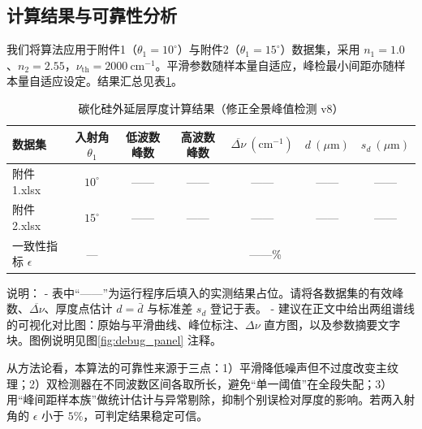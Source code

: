\documentclass{ctexart} %
\begin{document}
\subsection{计算结果与可靠性分析}
我们将算法应用于附件1（\(\theta_1=10^\circ\)）与附件2（\(\theta_1=15^\circ\)）数据集，采用 \(n_1=1.0\)、\(n_2=2.55\)，\(\nu_{\mathrm{th}}=2000~\mathrm{cm}^{-1}\)。平滑参数随样本量自适应，峰检最小间距亦随样本量自适应设定。结果汇总见表\ref{tab:res_sic}。

\begin{table}[h]
    \centering
    \caption{碳化硅外延层厚度计算结果（修正全景峰值检测 v8）}
    \label{tab:res_sic}
    \begin{tabular}{lcccccc}
        \toprule
        数据集              & 入射角 $\theta_1$ & 低波数峰数                    & 高波数峰数 & $\overline{\Delta \nu}\ (\mathrm{cm}^{-1})$ & $d\ (\mu\mathrm{m})$ & $s_d\ (\mu\mathrm{m})$ \\
        \midrule
        附件1.xlsx         & $10^\circ$     & ——                       & ——    & ——                                          & ——                   & ——                     \\
        附件2.xlsx         & $15^\circ$     & ——                       & ——    & ——                                          & ——                   & ——                     \\
        \midrule
        一致性指标 $\epsilon$ & —              & \multicolumn{5}{c}{——\%}                                                                                                       \\
        \bottomrule
    \end{tabular}
\end{table}

说明：
- 表中“——”为运行程序后填入的实测结果占位。请将各数据集的有效峰数、\(\overline{\Delta\nu}\)、厚度点估计 \(d=\bar d\) 与标准差 \(s_d\) 登记于表。
- 建议在正文中给出两组谱线的可视化对比图：原始与平滑曲线、峰位标注、\(\Delta\nu\) 直方图，以及参数摘要文字块。图例说明见图\ref{fig:debug_panel} 注释。

从方法论看，本算法的可靠性来源于三点：1）平滑降低噪声但不过度改变主纹理；2）双检测器在不同波数区间各取所长，避免“单一阈值”在全段失配；3）用“峰间距样本族”做统计估计与异常剔除，抑制个别误检对厚度的影响。若两入射角的 \(\epsilon\) 小于 \(5\%\)，可判定结果稳定可信。
\end{document}
